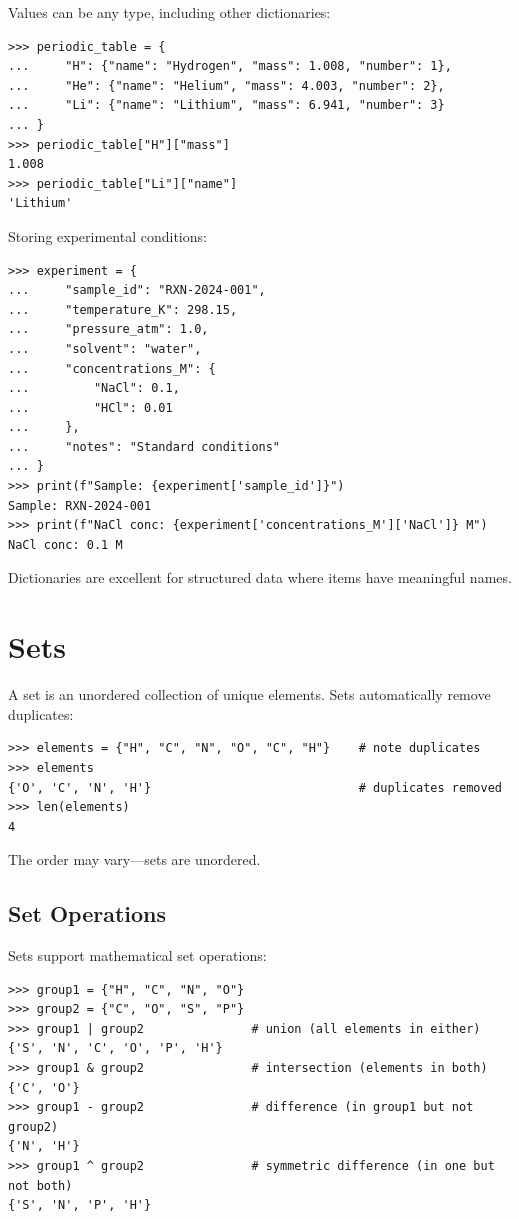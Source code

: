 Values can be any type, including other dictionaries:

\begin{lstlisting}
>>> periodic_table = {
...     "H": {"name": "Hydrogen", "mass": 1.008, "number": 1},
...     "He": {"name": "Helium", "mass": 4.003, "number": 2},
...     "Li": {"name": "Lithium", "mass": 6.941, "number": 3}
... }
>>> periodic_table["H"]["mass"]
1.008
>>> periodic_table["Li"]["name"]
'Lithium'
\end{lstlisting}

\begin{labexample}
Storing experimental conditions:
\begin{lstlisting}
>>> experiment = {
...     "sample_id": "RXN-2024-001",
...     "temperature_K": 298.15,
...     "pressure_atm": 1.0,
...     "solvent": "water",
...     "concentrations_M": {
...         "NaCl": 0.1,
...         "HCl": 0.01
...     },
...     "notes": "Standard conditions"
... }
>>> print(f"Sample: {experiment['sample_id']}")
Sample: RXN-2024-001
>>> print(f"NaCl conc: {experiment['concentrations_M']['NaCl']} M")
NaCl conc: 0.1 M
\end{lstlisting}
Dictionaries are excellent for structured data where items have meaningful names.
\end{labexample}

\section{Sets}
\label{sec:sets}

A set is an unordered collection of unique elements. Sets automatically remove duplicates:

\begin{lstlisting}
>>> elements = {"H", "C", "N", "O", "C", "H"}    # note duplicates
>>> elements
{'O', 'C', 'N', 'H'}                             # duplicates removed
>>> len(elements)
4
\end{lstlisting}

The order may vary---sets are unordered.

\subsection{Set Operations}

Sets support mathematical set operations:

\begin{lstlisting}
>>> group1 = {"H", "C", "N", "O"}
>>> group2 = {"C", "O", "S", "P"}
>>> group1 | group2               # union (all elements in either)
{'S', 'N', 'C', 'O', 'P', 'H'}
>>> group1 & group2               # intersection (elements in both)
{'C', 'O'}
>>> group1 - group2               # difference (in group1 but not group2)
{'N', 'H'}
>>> group1 ^ group2               # symmetric difference (in one but not both)
{'S', 'N', 'P', 'H'}
\end{lstlisting}

